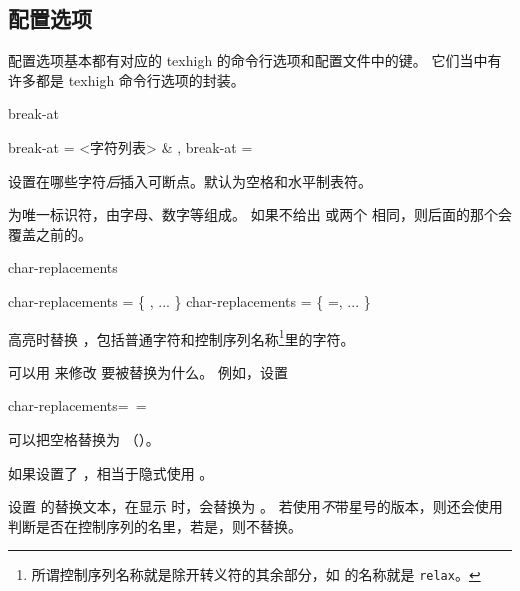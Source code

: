 \documentclass[class=article,openany]{cusdoc}[2025/10/10]
\begin{document}
\subsection{配置选项}

配置选项基本都有对应的 texhigh 的命令行选项和配置文件中的键。
它们当中有许多都是 texhigh 命令行选项的封装。

\begin{keyval}[path=high]{break-at}
  \begin{syntax}
    break-at = <{字符列表}> & \V{\\\ }, 
    break-at =  
  \end{syntax}
设置在哪些字符\emph{后}插入可断点。默认为空格和水平制表符。

 为唯一标识符，由字母、数字等组成。
如果不给出  或两个  相同，则后面的那个会覆盖之前的。
\end{keyval}

\begin{keyval}[path=high]{char-replacements}
  \begin{syntax}
    char-replacements = \V\{ , ... \V\}
    char-replacements = \V\{ =, ... \V\}
  \end{syntax}
高亮时替换 ，包括普通字符和控制序列名称\footnote{所谓控制序列名称就是除开转义符的其余部分，如  的名称就是 \texttt{relax}。}里的字符。

可以用  来修改  要被替换为什么。
例如，设置
\begin{thverbatim}
  char-replacements={\ =\textvisiblespace}
\end{thverbatim}
可以把空格替换为 \texttt{\textvisiblespace}（）。

如果设置了 ，相当于隐式使用 。
\end{keyval}

\begin{function}{\THSetCharReplacement}
  \begin{syntax}
    \V\THSetCharReplacement   {} 
    \V\THSetCharReplacement *  
  \end{syntax}
设置  的替换文本，在显示  时，会替换为 。
若使用\emph{不}带星号的版本，则还会使用  判断是否在控制序列的名里，若是，则不替换。
\end{function}
\end{document}
